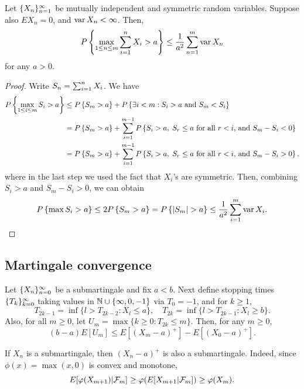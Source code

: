 \documentclass[a4paper]{article}
\begin{document}
\begin{thm}
  Let $\{ X_n \}_{n=1}^\infty$ be mutually independent and symmetric random
  variables. Suppose also $E X_n = 0$,
  and $\operatorname{var} X_n < \infty$. Then,
  \[
    P \left\{ \max_{1 \leq n \leq m} \sum_{i=1}^n X_i > a \right\}
    \leq \frac{1}{a^2} \sum_{n=1}^m \operatorname{var} X_n
  \]
  for any $a > 0$.
\end{thm}

\begin{proof}
  Write $S_n = \sum_{i=1}^n X_i$. We have
  \begin{align*}
    P \left\{ \max_{1 \leq i \leq m} S_i > a \right\}
     & \leq P \left\{ S_m > a \right\}
    + P \left\{ \exists i < m : S_i > a \text{ and } S_m < S_i \right\} \\
     & = P \left\{ S_m > a \right\}
    + \sum_{i=1}^{m - 1} P \left\{ S_i > a, \; S_r \leq a
    \text{ for all $r < i$, and } S_m - S_i < 0 \right\}                \\
     & = P \left\{ S_m > a \right\}
    + \sum_{i=1}^{m - 1} P \left\{ S_i > a, \; S_r \leq a
    \text{ for all $r < i$, and } S_m - S_i > 0 \right\},
  \end{align*}
  where in the last step we used the fact that $X_i$'s are symmetric.
  Then, combining $S_i > a$ and $S_m - S_i > 0$, we can obtain
  \[
    P \left\{ \max S_i > a \right\}
    \leq 2 P \left\{ S_m > a \right\}
    = P \left\{ \left\lvert S_m\right\rvert > a \right\}
    \leq \frac{1}{a^2} \sum_{i=1}^m \operatorname{var} X_i.
  \]

\end{proof}

\subsection{Martingale convergence}

\begin{thm}
  Let $\{ X_n \}_{n=0}^\infty$ be a submartingale and fix $a < b$.
  Next define stopping times $\{ T_k \}_{k=0}^\infty$ taking values
  in $\mathbb{N} \cup \{\infty, 0, -1\}$ via $T_0 = -1$, and for
  $k \geq 1$,
  \[
    T_{2k - 1} = \inf \{l > T_{2k-2} : X_l \leq a\}, \quad
    T_{2k} = \inf \{l > T_{2k-1}: X_l \geq b\}.
  \]
  Also, for all $m \geq 0$, let $U_m = \max \{k \geq 0:  T_{2k} \leq m \}$.
  Then, for any $m \geq 0$,
  \[
    (b - a) E [U_m] \leq E [(X_m - a)^+] - E [(X_0 - a)^+].
  \]
\end{thm}

\begin{remark}
  If $X_n$ is a submartingale, then $(X_n - a)^+$ is also a
  submartingale. Indeed, since $\phi(x) = \max(x, 0)$ is convex and
  monotone,
  \[
    E [\varphi(X_{m + 1}) | \mathcal{F}_m] \geq \varphi (E [X_{m + 1} | \mathcal{F}_m])
    \geq \varphi(X_m).
  \]
\end{remark}
\end{document}
